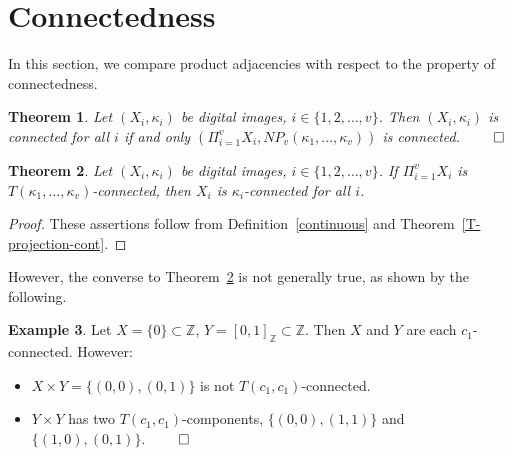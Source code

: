 \documentclass{article}
\theoremstyle{plain}
\newtheorem{thm}{Theorem}
\theoremstyle{definition}
\newtheorem{exl}[thm]{Example}
\numberwithin{thm}{section}
\def\Z{{\mathbb Z}}
\begin{document}
\section{Connectedness}
In this section, we compare product 
adjacencies with respect to the
property of connectedness.

\begin{thm}
\label{prod-connected}
\rm{\cite{Boxer16a}}
Let $(X_i,\kappa_i)$ be digital images, $i \in \{1,2, \ldots, v\}$. Then
$(X_i,\kappa_i)$ is connected for all $i$ if and only
$(\Pi_{i=1}^v X_i, NP_v(\kappa_1, \ldots, \kappa_v))$ is connected. $\qed$
\end{thm}

\begin{comment}
The statement analogous to Theorem~\ref{prod-connected}
is not generally true if a $c_u$-adjacency is
used instead of $NP_v(\kappa_1, \ldots, \kappa_v)$
for $X \times Y$, as shown by the following.


\begin{exl}
\rm{\cite{BoxKar12}} Let $X=[0,1]_{\Z}$,
$Y=\{(0,0),(1,1)\} \subset \Z^2$. Then
$X \times Y$ is $c_2$-connected, but $Y$ is not
$c_1$-connected. Also, $X$ is $c_1$-connected
and $Y$ is $c_2$-connected, but $X \times Y$ is
not $c_1$-connected. \qed
\end{exl}
\end{comment}

\begin{thm}
\label{Pi-conn}
Let $(X_i,\kappa_i)$ be digital images, $i \in \{1,2, \ldots, v\}$.
If 
$\Pi_{i=1}^v X_i$ is $T(\kappa_1, \ldots, \kappa_v)$-connected, then $X_i$ is $\kappa_i$-connected for all $i$.
\end{thm}

\begin{proof}
These assertions follow from
Definition~\ref{continuous} and Theorem~\ref{T-projection-cont}.
\end{proof}

However, the converse to
Theorem~\ref{Pi-conn} is not
generally true, as shown by the
following.

\begin{exl}
\label{conn-not-preserved}
Let $X = \{0\} \subset \Z$,
$Y = [0,1]_{\Z} \subset \Z$. Then
$X$ and $Y$ are each $c_1$-connected.
However:
\begin{itemize}
\item $X \times Y = \{(0,0), (0,1)\}$ is not
$T(c_1,c_1)$-connected.
\item $Y \times Y$ has two $T(c_1,c_1)$-components,
$\{(0,0), (1,1)\}$ and $\{(1,0),(0,1)\}$. $\qed$
\end{itemize}
\end{exl}
\end{document}
